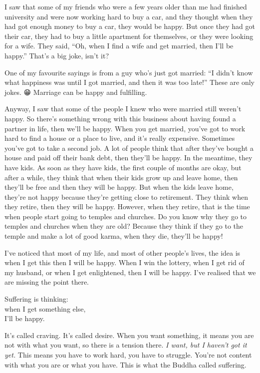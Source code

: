 \documentclass[12pt, openany]{book}
\newenvironment{aphorism}%
{%
\begin{center}\begin{itshape}
}%
{\end{itshape}\end{center}
}%
\begin{document}
I saw that some of my friends who were a few years older than me had finished university and were now working hard to buy a car, and they thought when they had got enough money to buy a car, they would be happy. But once they had got their car, they had to buy a little apartment for themselves, or they were looking for a wife. They said, “Oh, when I find a wife and get married, then I’ll be happy.” That’s a big joke, isn’t it? 

One of my favourite sayings is from a guy who’s just got married: “I didn’t know what happiness was until I got married, and then it was too late!” These are only jokes. 😁 Marriage can be happy and fulfilling. 

Anyway, I saw that some of the people I knew who were married still weren’t happy. So there’s something wrong with this business about having found a partner in life, then we’ll be happy. When you get married, you’ve got to work hard to find a house or a place to live, and it’s really expensive. Sometimes you’ve got to take a second job. A lot of people think that after they’ve bought a house and paid off their bank debt, then they’ll be happy. In the meantime, they have kids. As soon as they have kids, the first couple of months are okay, but after a while, they think that when their kids grow up and leave home, then they’ll be free and then they will be happy. But when the kids leave home, they’re not happy because they’re getting close to retirement. They think when they retire, then they will be happy. However, when they retire, that is the time when people start going to temples and churches. Do you know why they go to temples and churches when they are old? Because they think if they go to the temple and make a lot of good karma, when they die, they’ll be happy! 

I’ve noticed that most of my life, and most of other people’s lives, the idea is when I get this then I will be happy. When I win the lottery, when I get rid of my husband, or when I get enlightened, then I will be happy. I’ve realised that we are missing the point there. 

\begin{aphorism}
Suffering is thinking:\\  
when I get something else,\\ 
I’ll be happy.
\end{aphorism}

It’s called craving. It’s called desire. When you want something, it means you are not with what you want, so there is a tension there. \emph{I want, but I haven’t got it yet.} This means you have to work hard, you have to struggle. You’re not content with what you are or what you have. This is what the Buddha called suffering. 
\end{document}

